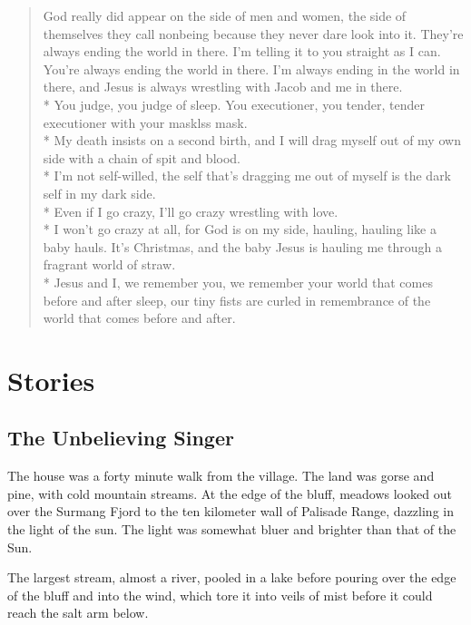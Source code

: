 \documentclass[english,11pt,letterpaper,onecolumn]{scrbook}
\begin{document}
\begin{verse}

God really did appear on the side of men and women, the side of themselves they call nonbeing because they never dare look into it.
They're always ending the world in there.  I'm telling it to you straight as I can.  You're always ending the world in there.  I'm always ending in the world in there, and Jesus is always wrestling with Jacob and me in there. \\*
You judge, you judge of sleep.  You executioner, you tender, tender executioner with your masklss mask. \\*
My death insists on a second birth, and I will drag myself out of my own side with a chain of spit and blood. \\*
I'm not self-willed, the self that's dragging me out of myself is the dark self in my dark side. \\*
Even if I go crazy, I'll go crazy wrestling with love. \\*
I won't go crazy at all, for God is on my side, hauling, hauling like a baby hauls.  It's Christmas, and the baby Jesus is hauling me through a fragrant world of straw. \\*
Jesus and I, we remember you, we remember your world that comes before and after sleep, our tiny fists are curled in remembrance of the world that comes before and after.

\end{verse}

\part{Stories}
\chapter{The Unbelieving Singer}

	The house was a forty minute walk from the village. The land was gorse and pine, with cold mountain streams. At the edge of the bluff, meadows looked out over the Surmang Fjord to the ten kilometer wall of Palisade Range, dazzling in the light of the sun. The light was somewhat bluer and brighter than that of the Sun. 

	The largest stream, almost a river, pooled in a lake before pouring over the edge of the bluff and into the wind, which tore it into veils of mist before it could reach the salt arm below. 
\end{document}
